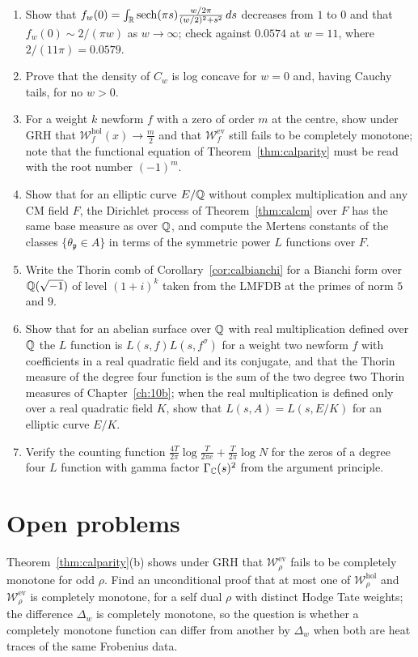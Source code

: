 \begin{enumerate}
\item Show that $f_w(0)=\int_{\mathbb{R}}\operatorname{sech}(\pi s)\frac{w/2\pi}{(w/2)^2+s^2}\,ds$ decreases from $1$ to $0$ and that $f_w(0)\sim2/(\pi w)$ as $w\to\infty$; check against $0.0574$ at $w=11$, where $2/(11\pi)=0.0579$.
\item Prove that the density of $C_w$ is log concave for $w=0$ and, having Cauchy tails, for no $w>0$.
\item For a weight $k$ newform $f$ with a zero of order $m$ at the centre, show under GRH that $\mathcal W^{\mathrm{hol}}_f(x)\to\frac m2$ and that $\mathcal W^{\mathrm{ev}}_f$ still fails to be completely monotone; note that the functional equation of Theorem~\ref{thm:calparity} must be read with the root number $(-1)^m$.
\item Show that for an elliptic curve $E/\mathbb{Q}$ without complex multiplication and any CM field $F$, the Dirichlet process of Theorem~\ref{thm:calcm} over $F$ has the same base measure as over $\mathbb{Q}$, and compute the Mertens constants of the classes $\{\theta_{\mathfrak p}\in A\}$ in terms of the symmetric power $L$ functions over $F$.
\item Write the Thorin comb of Corollary~\ref{cor:calbianchi} for a Bianchi form over $\mathbb{Q}(\sqrt{-1})$ of level $(1+i)^k$ taken from the LMFDB at the primes of norm $5$ and $9$.
\item Show that for an abelian surface over $\mathbb{Q}$ with real multiplication defined over $\mathbb{Q}$ the $L$ function is $L(s,f)L(s,f^\sigma)$ for a weight two newform $f$ with coefficients in a real quadratic field and its conjugate, and that the Thorin measure of the degree four function is the sum of the two degree two Thorin measures of Chapter~\ref{ch:10b}; when the real multiplication is defined only over a real quadratic field $K$, show that $L(s,A)=L(s,E/K)$ for an elliptic curve $E/K$.
\item Verify the counting function $\frac{4T}{2\pi}\log\frac T{2\pi e}+\frac T{2\pi}\log N$ for the zeros of a degree four $L$ function with gamma factor $\Gamma_{\mathbb{C}}(s)^2$ from the argument principle.
\end{enumerate}

\section{Open problems}

\begin{problem}\label{op:calparity}
Theorem~\ref{thm:calparity}(b) shows under GRH that $\mathcal W^{\mathrm{ev}}_\rho$ fails to be completely monotone for odd $\rho$. Find an unconditional proof that at most one of $\mathcal W^{\mathrm{hol}}_\rho$ and $\mathcal W^{\mathrm{ev}}_\rho$ is completely monotone, for a self dual $\rho$ with distinct Hodge Tate weights; the difference $\Delta_w$ is completely monotone, so the question is whether a completely monotone function can differ from another by $\Delta_w$ when both are heat traces of the same Frobenius data.
\end{problem}

